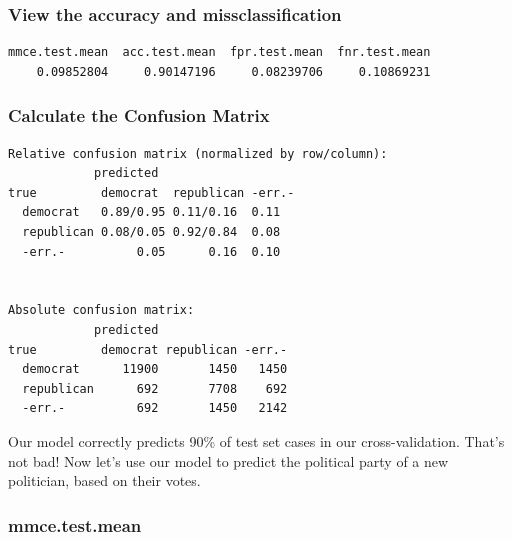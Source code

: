\documentclass[
]{article}
\newenvironment{Shaded}{\begin{snugshade}}{\end{snugshade}}
\newcommand{\AttributeTok}[1]{\textcolor[rgb]{0.13,0.29,0.53}{#1}}
\newcommand{\ConstantTok}[1]{\textcolor[rgb]{0.56,0.35,0.01}{#1}}
\newcommand{\FunctionTok}[1]{\textcolor[rgb]{0.13,0.29,0.53}{\textbf{#1}}}
\newcommand{\NormalTok}[1]{#1}
\newcommand{\SpecialCharTok}[1]{\textcolor[rgb]{0.81,0.36,0.00}{\textbf{#1}}}
\begin{document}
\subsubsection{View the accuracy and
missclassification}\label{view-the-accuracy-and-missclassification}

\begin{Shaded}
\end{Shaded}

\begin{verbatim}
mmce.test.mean  acc.test.mean  fpr.test.mean  fnr.test.mean 
    0.09852804     0.90147196     0.08239706     0.10869231 
\end{verbatim}

\subsubsection{Calculate the Confusion
Matrix}\label{calculate-the-confusion-matrix-1}

\begin{Shaded}
\end{Shaded}

\begin{verbatim}
Relative confusion matrix (normalized by row/column):
            predicted
true         democrat  republican -err.-   
  democrat   0.89/0.95 0.11/0.16  0.11     
  republican 0.08/0.05 0.92/0.84  0.08     
  -err.-          0.05      0.16  0.10     


Absolute confusion matrix:
            predicted
true         democrat republican -err.-
  democrat      11900       1450   1450
  republican      692       7708    692
  -err.-          692       1450   2142
\end{verbatim}

Our model correctly predicts 90\% of test set cases in our
cross-validation. That's not bad! Now let's use our model to predict the
political party of a new politician, based on their votes.

\subsubsection{mmce.test.mean}\label{mmce.test.mean}
\end{document}
